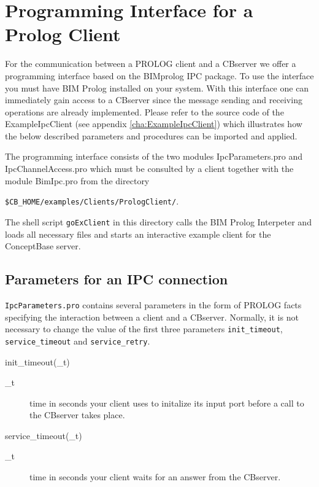 
\chapter{Programming Interface for a Prolog Client}
\label{cha:prolog client}


For the communication between a PROLOG client and a CBserver we offer a 
programming interface based on the BIMprolog IPC package. To use the interface
you must have BIM Prolog installed on your system. With this 
interface one can immediately gain access to a CBserver since the message 
sending and receiving operations are already implemented. Please refer to 
the source code of the ExampleIpcClient (see appendix \ref{cha:ExampleIpcClient}) 
which illustrates how 
the below described parameters and procedures can be imported and applied.


The programming interface consists of the two modules IpcParameters.pro and 
 IpcChannelAccess.pro  which must be consulted by a client together with 
the module BimIpc.pro from the directory
\begin{center}
  \verb+$CB_HOME/examples/Clients/PrologClient/+.
\end{center}

The shell script \verb+goExClient+ in this directory calls the BIM Prolog
Interpeter and loads all necessary files and starts an interactive
example client for the ConceptBase server.

\section{Parameters for an IPC connection}

{\tt IpcParameters.pro} contains several parameters in the form of
PROLOG facts specifying the interaction between a client and a
CBserver. Normally, it is not necessary to change the value of the
first three parameters {\tt init\_timeout}, {\tt service\_timeout}
and {\tt service\_retry}.

\begin{method}{init\_timeout(\_t)}
  \begin{description}
  \item[\_t] time in seconds your client uses to initalize its
	 input port before a call to the CBserver takes place.
  \end{description}
\end{method}

\begin{method}{service\_timeout(\_t)}
  \begin{description}
  \item[\_t] time in seconds your client waits for an answer
    from the CBserver.
   \end{description}
\end{method}
 	
